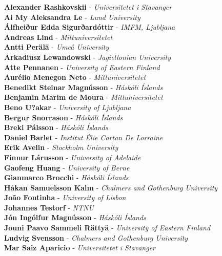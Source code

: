 \documentclass[12pt,openany]{report}      %
\begin{document}
\bigskip
\bigskip
\noindent
\textbf{Alexander Rashkovskii} - 
\textit{Universitetet i Stavanger}
\\
\textbf{Ai My Aleksandra Le} - 
\textit{Lund University}
\\
\textbf{Álfheiður Edda Sigurðardóttir} - 
\textit{IMFM, Ljubljana}
\\
\textbf{Andreas Lind} - 
\textit{Mittuniversitetet}
\\
\textbf{Antti Perälä} - 
\textit{Umeå University}
\\
\textbf{Arkadiusz Lewandowski} - 
\textit{Jagiellonian University}
\\
\textbf{Atte Pennanen} - 
\textit{University of Eastern Finland}
\\
\textbf{Aurélio Menegon Neto} - 
\textit{Mittuniversitetet}
\\
\textbf{Benedikt Steinar Magnússon} - 
\textit{Háskóli Íslands}
\\
\textbf{Benjamin Marim de Moura} - 
\textit{Mittuniversitetet}
\\
\textbf{Beno U?akar} - 
\textit{University of Ljubljana}
\\
\textbf{Bergur Snorrason} - 
\textit{Háskóli Íslands}
\\
\textbf{Breki Pálsson} - 
\textit{Háskóli Íslands}
\\
\textbf{Daniel Barlet} - 
\textit{Institut Élie Cartan De Lorraine}
\\
\textbf{Erik Avelin} - 
\textit{Stockholm University}
\\
\textbf{Finnur Lárusson} - 
\textit{University of Adelaide}
\\
\textbf{Gaofeng Huang} - 
\textit{University of Berne}
\\
\textbf{Gianmarco Brocchi} - 
\textit{Háskóli Íslands}
\\
\textbf{Håkan Samuelsson Kalm} - 
\textit{Chalmers and Gothenburg University}
\\
\textbf{João Fontinha} - 
\textit{University of Lisbon}
\\
\textbf{Johannes Testorf} - 
\textit{NTNU}
\\
\textbf{Jón Ingólfur Magnússon} - 
\textit{Háskóli Íslands}
\\
\textbf{Jouni Paavo Sammeli Rättyä} - 
\textit{University of Eastern Finland}
\\
\textbf{Ludvig Svensson} - 
\textit{Chalmers and Gothenburg University}
\\
\textbf{Mar Saiz Aparicio} - 
\textit{Universitetet i Stavanger}
\\
\end{document}
